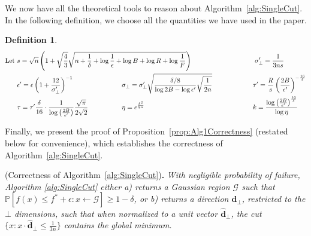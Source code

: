 \documentclass[11pt,letter]{article}
\renewcommand{\Pr}{\mathbb{P}}
\newcommand{\from}{\leftarrow}
\renewcommand{\vec}[1]{\mathbf{#1}}
\newcommand{\ferr}{\epsilon}
\newcommand{\perr}{\delta}
\newcommand{\safety}{s}
\newcounter{nTheorems}
\numberwithin{nTheorems}{section}
\newtheorem{definition}[nTheorems]{Definition}
\begin{document}
We now have all the theoretical tools to reason about Algorithm~\ref{alg:SingleCut}.
In the following definition, we choose all the quantities we have used in the paper.
\begin{definition}\label{def:Parameters}
\begin{alignat*}{4}
\text{Let }&\safety = \sqrt{n}\left(1+ \sqrt{\frac{4}{3}}\sqrt{n + \frac{1}{\perr} + \log \frac{1}{\ferr} + \log B + \log R + \log \frac{1}{F}}\right) \hspace{1cm}&& \hspace{2cm} \sigma_\bot' = \frac{1}{3n\safety} \hspace{1cm} \hspace{-2cm}&& \\
&\ferr' = \ferr\left(1 + \frac{12}{\sigma_\bot'}\right)^{-1} &&\hspace{-5cm}\sigma_\bot = \sigma_\bot'\sqrt{\frac{\perr/8}{\log 2B - \log \ferr'}\sqrt{\frac{1}{2n}}} && \hspace{-1cm}\tau' = \frac{R}{\safety}\left(\frac{2B}{\ferr'}\right)^{-\frac{16}{\perr}}\\
&\tau=\tau'\frac{\perr}{16}\cdot\frac{1}{\log\left(\frac{2B}{\epsilon'}\right)}\frac{\sqrt{\pi}}{2\sqrt{2}} &&\hspace{-5cm} \eta = e^{\frac{\perr^2}{8n}} && \hspace{-1cm} k = \frac{\log \left(\frac{2B}{\ferr'}\right)^{\frac{16}{\perr}}}{\log \eta}
\end{alignat*}
\end{definition}

Finally, we present the proof of Proposition~\ref{prop:Alg1Correctness} (restated below for convenience), which establishes the correctness of Algorithm~\ref{alg:SingleCut}.

\medskip{} (Correctness of Algorithm~\ref{alg:SingleCut}){\bf .} \emph{With negligible probability of failure, Algorithm \ref{alg:SingleCut} either a) returns a Gaussian region $\mathcal{G}$ such that $\Pr[f(x) \le f^\ast+\ferr : x \from \mathcal{G}] \ge 1 - \perr$, or b) returns a direction $\vec{d}_\bot$, restricted to the $\bot$ dimensions, such that when normalized to a unit vector $\hat{\vec{d}}_\bot$, the cut $\{x:x\cdot \hat{\vec{d}}_\bot\leq \frac{1}{3n}\}$ contains the global minimum.
}
\end{document}
